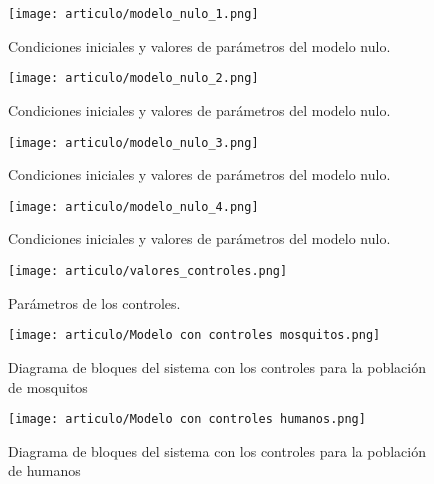 \documentclass[journal]{IEEEtran}
\begin{document}
\begin{figure}[h]
\texttt{[image: articulo/modelo\_nulo\_1.png]}
\centering 
\caption{Condiciones iniciales y valores de parámetros del modelo nulo.}
\label{Fi:valores modelo nulo1}
\end{figure}


\begin{figure}[h]
\texttt{[image: articulo/modelo\_nulo\_2.png]}
\centering 
\caption{Condiciones iniciales y valores de parámetros del modelo nulo.}
\label{Fi:valores modelo nulo2}
\end{figure}


\begin{figure}[h]
\texttt{[image: articulo/modelo\_nulo\_3.png]}
\centering 
\caption{Condiciones iniciales y valores de parámetros del modelo nulo.}
\label{Fi:valores modelo nulo3}
\end{figure}

\begin{figure}[h]
\texttt{[image: articulo/modelo\_nulo\_4.png]}
\centering 
\caption{Condiciones iniciales y valores de parámetros del modelo nulo.}
\label{Fi:valores modelo nulo4}
\end{figure}

\begin{figure}[h]
\texttt{[image: articulo/valores\_controles.png]}
\centering 
\caption{Parámetros de los controles.}
\label{Fi:val_controles}
\end{figure}



\begin{figure}[h]
\texttt{[image: articulo/Modelo con controles mosquitos.png]}
\centering 
\caption{Diagrama de bloques del sistema con los controles para la población de mosquitos}
\label{Fi:diag_controles1}
\end{figure}

\begin{figure}[h]
\texttt{[image: articulo/Modelo con controles humanos.png]}
\centering 
\caption{Diagrama de bloques del sistema con los controles para la población de humanos}
\label{Fi:diag_controles2}
\end{figure}
\end{document}

